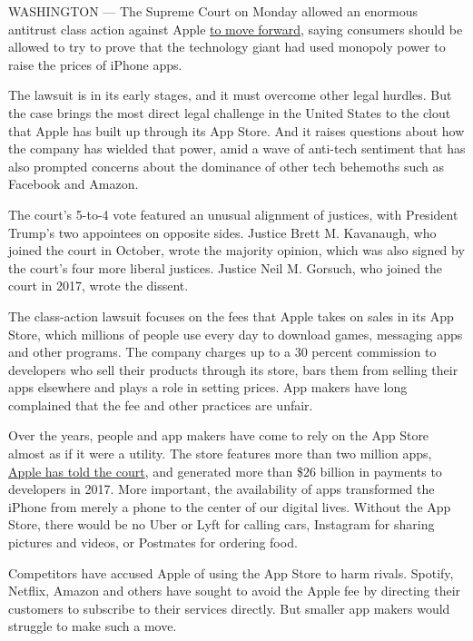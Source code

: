 WASHINGTON --- The Supreme Court on Monday allowed an enormous antitrust
class action against Apple
\href{https://www.supremecourt.gov/opinions/18pdf/17-204_bq7d.pdf}{to
move forward}, saying consumers should be allowed to try to prove that
the technology giant had used monopoly power to raise the prices of
iPhone apps.

The lawsuit is in its early stages, and it must overcome other legal
hurdles. But the case brings the most direct legal challenge in the
United States to the clout that Apple has built up through its App
Store. And it raises questions about how the company has wielded that
power, amid a wave of anti-tech sentiment that has also prompted
concerns about the dominance of other tech behemoths such as Facebook
and Amazon.

The court's 5-to-4 vote featured an unusual alignment of justices, with
President Trump's two appointees on opposite sides. Justice Brett M.
Kavanaugh, who joined the court in October, wrote the majority opinion,
which was also signed by the court's four more liberal justices. Justice
Neil M. Gorsuch, who joined the court in 2017, wrote the dissent.

The class-action lawsuit focuses on the fees that Apple takes on sales
in its App Store, which millions of people use every day to download
games, messaging apps and other programs. The company charges up to a 30
percent commission to developers who sell their products through its
store, bars them from selling their apps elsewhere and plays a role in
setting prices. App makers have long complained that the fee and other
practices are unfair.

Over the years, people and app makers have come to rely on the App Store
almost as if it were a utility. The store features more than two million
apps,
\href{https://www.supremecourt.gov/DocketPDF/17/17-204/59108/20180810114516634_17-204\%20ts.pdf}{Apple
has told the court}, and generated more than \$26 billion in payments to
developers in 2017. More important, the availability of apps transformed
the iPhone from merely a phone to the center of our digital lives.
Without the App Store, there would be no Uber or Lyft for calling cars,
Instagram for sharing pictures and videos, or Postmates for ordering
food.

Competitors have accused Apple of using the App Store to harm rivals.
Spotify, Netflix, Amazon and others have sought to avoid the Apple fee
by directing their customers to subscribe to their services directly.
But smaller app makers would struggle to make such a move.

